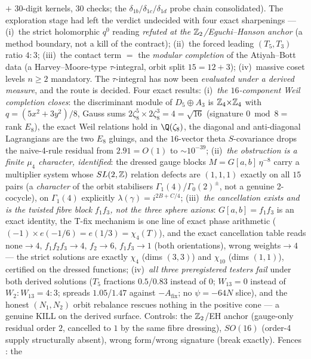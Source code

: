 $+$ 30-digit kernels, $30$ checks; the $\delta_{1b}/\delta_{1c}/\delta_{1d}$ probe chain
consolidated). The exploration stage had left the verdict undecided with four exact
sharpenings ---
(i)~the strict holomorphic $q^0$ reading \emph{refuted at the $\mathbb Z_2$/Eguchi--Hanson anchor}
(a method boundary, not a kill of the contract); (ii)~the forced leading $(T_5,T_3)$ ratio
$4{:}3$; (iii)~the contact term $=$ the \emph{modular completion} of the Atiyah--Bott data
(a Harvey--Moore-type $\tau$-integral, orbit split $15=12+3$); (iv)~massive coset levels
$n\ge2$ mandatory. The $\tau$-integral has now been \emph{evaluated under a derived measure},
and the route is decided. Four exact results: (i)~\emph{the $16$-component Weil completion
closes}: the discriminant module of $D_5\oplus A_3$ is $\mathbb Z_4{\times}\mathbb Z_4$ with
$q=(5x^2{+}3y^2)/8$, Gauss sums $2\zeta_8^5\times2\zeta_8^3=4=\sqrt{16}$ (signature $0\bmod8=$
rank $E_8$), the exact Weil relations hold in $\Q(\zeta_8)$, the diagonal and anti-diagonal
Lagrangians are the two $E_8$ gluings, and the $16$-vector theta $S$-covariance drops the
naive-4-rule residual from $2.91=O(1)$ to $\sim10^{-39}$; (ii)~\emph{the obstruction is a
finite $\mu_4$ character, identified}: the dressed gauge blocks $M=G[a,b]\,\eta^{-8}$ carry a
multiplier system whose $SL(2,\mathbb Z)$ relation defects are $(1,1,1)$ exactly on all $15$ pairs
(a \emph{character} of the orbit stabilisers $\Gamma_1(4)$/$\Gamma_0(2)^\pm$, not a genuine
2-cocycle), on $\Gamma_1(4)$ explicitly $\lambda(\gamma)=i^{2B+C/4}$; (iii)~\emph{the
cancellation exists and is the twisted fibre block $f_1f_3$, not the three sphere axions}:
$G[a,b]=f_1f_3$ is an exact identity, the T-fix mechanism is one line of exact phase
arithmetic ($(-1)\times e(-1/6)=e(1/3)=\chi_4(T)$), and the exact cancellation table reads
none${}\to4$, $f_1f_2f_3\to4$, $f_2\to6$, $f_1f_3\to1$ (both orientations), wrong
weights${}\to4$ --- the strict solutions are exactly $\chi_4$ (dims $(3,3)$) and $\chi_{10}$
(dims $(1,1)$), certified on the dressed functions; (iv)~\emph{all three preregistered testers
fail} under both derived solutions ($T_5$ fractions $0.5$/$0.83$ instead of $0$; $W_{13}=0$
instead of $W_2{:}W_{13}=4{:}3$; spreads $1.05$/$1.47$ against $-A_{\mathrm{fix}}$; no
$\psi=-64N$ slice), and the honest $(N_1,N_2)$ orbit rebalance rescues nothing in the positive
cone --- a genuine KILL on the derived surface. Controls: the $\mathbb Z_2$/EH anchor (gauge-only
residual order $2$, cancelled to $1$ by the same fibre dressing), $SO(16)$ (order-4 supply
structurally absent), wrong form/wrong signature (break exactly). Fences \mC: the
